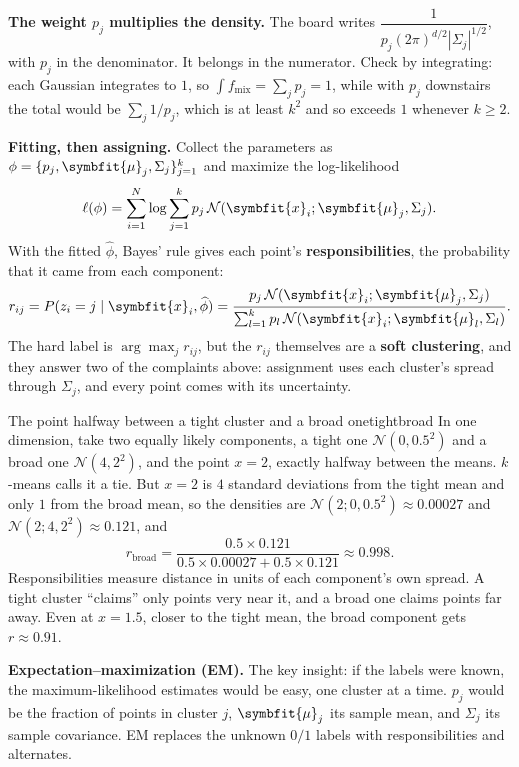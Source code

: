 \documentclass[11pt]{article}
\newcommand{\bm}[1]{\symbfit{#1}}
\newcommand{\vx}{\bm{x}}
\begin{document}
\begin{careful}
\textbf{The weight $p_j$ multiplies the density.} The board writes $\dfrac1{p_j(2\pi)^{d/2}|\Sigma_j|^{1/2}}$, with $p_j$ in the denominator. It belongs in the numerator. Check by integrating: each Gaussian integrates to $1$, so $\int f_{\mathrm{mix}}=\sum_jp_j=1$, while with $p_j$ downstairs the total would be $\sum_j1/p_j$, which is at least $k^2$ and so exceeds $1$ whenever $k\ge2$.
\end{careful}

\textbf{Fitting, then assigning.} Collect the parameters as $\phi=\{p_j,\bm\mu_j,\Sigma_j\}_{j=1}^k$ and maximize the log-likelihood
\[
\ell(\phi)=\sum_{i=1}^N\log\sum_{j=1}^kp_j\,\mathcal N(\vx_i;\bm\mu_j,\Sigma_j).
\]
With the fitted $\widehat\phi$, Bayes' rule gives each point's \textbf{responsibilities}, the probability that it came from each component:
\[
r_{ij}=P(z_i=j\mid\vx_i,\widehat\phi)=\frac{p_j\,\mathcal N(\vx_i;\bm\mu_j,\Sigma_j)}{\sum_{l=1}^kp_l\,\mathcal N(\vx_i;\bm\mu_l,\Sigma_l)} .
\]
The hard label is $\arg\max_jr_{ij}$, but the $r_{ij}$ themselves are a \textbf{soft clustering}, and they answer two of the complaints above: assignment uses each cluster's spread through $\Sigma_j$, and every point comes with its uncertainty.

\begin{example}{The point halfway between a tight cluster and a broad one}{tightbroad}
In one dimension, take two equally likely components, a tight one $\mathcal N(0,0.5^2)$ and a broad one $\mathcal N(4,2^2)$, and the point $x=2$, exactly halfway between the means. $k$-means calls it a tie. But $x=2$ is $4$ standard deviations from the tight mean and only $1$ from the broad mean, so the densities are $\mathcal N(2;0,0.5^2)\approx0.00027$ and $\mathcal N(2;4,2^2)\approx0.121$, and
\[
r_{\text{broad}}=\frac{0.5\times0.121}{0.5\times0.00027+0.5\times0.121}\approx0.998 .
\]
Responsibilities measure distance in units of each component's own spread. A tight cluster ``claims'' only points very near it, and a broad one claims points far away. Even at $x=1.5$, closer to the tight mean, the broad component gets $r\approx0.91$.
\end{example}

\textbf{Expectation--maximization (EM).} The key insight: if the labels were known, the maximum-likelihood estimates would be easy, one cluster at a time. $p_j$ would be the fraction of points in cluster $j$, $\bm\mu_j$ its sample mean, and $\Sigma_j$ its sample covariance. EM replaces the unknown $0/1$ labels with responsibilities and alternates.
\end{document}
